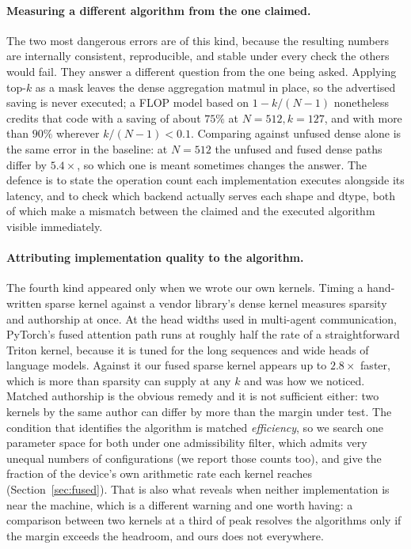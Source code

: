 \paragraph{Measuring a different algorithm from the one claimed.} The two most
dangerous errors are of this kind, because the resulting numbers are internally
consistent, reproducible, and stable under every check the others would fail.
They answer a different question from the one being asked. Applying top-$k$ as a
mask leaves the dense aggregation matmul in place, so the advertised saving is
never executed; a FLOP model based on $1-k/(N-1)$ nonetheless credits that code
with a saving of about $75\%$ at $N{=}512, k{=}127$, and with more than $90\%$ wherever
$k/(N-1) < 0.1$. Comparing against unfused dense alone is the same error in the
baseline: at $N{=}512$ the unfused and fused dense paths differ by $5.4\times$,
so which one is meant sometimes changes the answer. The defence is to state the
operation count each implementation executes alongside its latency, and to check
which backend actually serves each shape and dtype, both of which make a
mismatch between the claimed and the executed algorithm visible immediately.

\paragraph{Attributing implementation quality to the algorithm.} The fourth kind
appeared only when we wrote our own kernels. Timing a hand-written sparse kernel
against a vendor library's dense kernel measures sparsity and authorship at
once. At the head widths used in multi-agent communication, PyTorch's fused
attention path runs at roughly half the rate of a straightforward Triton kernel,
because it is tuned for the long sequences and wide heads of language models.
Against it our fused sparse kernel appears up to $2.8\times$ faster, which is
more than sparsity can supply at any $k$ and was how we noticed. Matched
authorship is the obvious remedy and it is not sufficient either: two kernels by
the same author can differ by more than the margin under test. The condition
that identifies the algorithm is matched \emph{efficiency}, so we search one
parameter space for both under one admissibility filter, which admits very
unequal numbers of configurations (we report those counts too), and give
the fraction of the device's own arithmetic rate each kernel reaches
(Section~\ref{sec:fused}). That is also what
reveals when neither implementation is near the machine, which is a different
warning and one worth having: a comparison between two kernels at a third of
peak resolves the algorithms only if the margin exceeds the headroom, and ours
does not everywhere.

